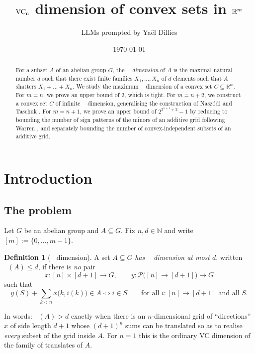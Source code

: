 \documentclass[11pt,a4paper]{article}
\title{$\VCn$ dimension of convex sets in $\R^m$}
\author{LLMs prompted by Yaël Dillies}
\date{\today}
\theoremstyle{plain}
\theoremstyle{definition}
\newtheorem{definition}[theorem]{Definition}
\DeclareMathOperator{\VCn}{\mathrm{VC}_n}
\newcommand{\R}{\mathbb{R}}
\newcommand{\N}{\mathbb{N}}
\begin{document}
\maketitle

\begin{abstract}
For a subset $A$ of an abelian group $G$, the \emph{$\VCn$ dimension} of $A$
is the maximal natural number $d$ such that there exist finite families $X_1, \dots, X_n$
of $d$ elements such that $A$ shatters $X_1 + \dots + X_n$.
We study the maximum $\VCn$ dimension of a convex set $C \subseteq \R^m$.
For $m = n$, we prove an upper bound of $2$, which is tight.
For $m = n + 2$, we construct a convex set $C$ of infinite $\VCn$ dimension,
generalising the construction of Naszódi and Taschuk \cite[Example~4]{naszoditaschuk}.
For $m = n + 1$, we prove an upper bound of $2^{2^{n + 1} + 2} - 1$ by reducing to bounding
the number of sign patterns of the minors of an additive grid following Warren \cite{warren},
and separately bounding the number of convex-independent subsets of an additive grid.
\end{abstract}

\tableofcontents

\section{Introduction}\label{sec:intro}

\subsection{The problem}

Let $G$ be an abelian group and $A\subseteq G$. Fix $n,d\in\N$ and write
$[m]:=\{0,\dots,m-1\}$.

\begin{definition}[$\VCn$ dimension]\label{def:vcn}
A set $A\subseteq G$ \emph{has $\VCn$ dimension at most $d$}, written
$\VCn(A)\le d$, if there is \emph{no} pair
\[
  x\colon [n]\times[d+1]\to G,
  \qquad
  y\colon \mathcal{P}\bigl([n]\to[d+1]\bigr)\to G
\]
such that
\begin{equation}\label{eq:shatter}
  y(S)+\sum_{k<n} x\bigl(k,i(k)\bigr)\in A
  \iff
  i\in S
  \qquad\text{for all } i\colon[n]\to[d+1] \text{ and all } S.
\end{equation}
\end{definition}

In words: $\VCn(A)>d$ exactly when there is an $n$-dimensional grid of
``directions'' $x$ of side length $d+1$ whose $(d+1)^n$ sums can be translated so as to
realise \emph{every} subset of the grid inside $A$. For $n=1$ this is the ordinary VC
dimension of the family of translates of $A$.
\end{document}
